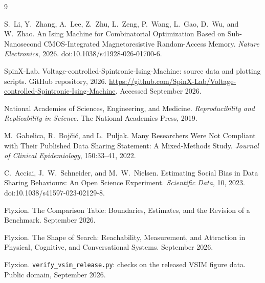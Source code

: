\documentclass[11pt]{article}
\theoremstyle{definition}
\theoremstyle{remark}
\begin{document}
\begin{thebibliography}{9}

S.~Li, Y.~Zhang, A.~Lee, Z.~Zhu, L.~Zeng, P.~Wang, L.~Gao, D.~Wu, and W.~Zhao.
An Ising Machine for Combinatorial Optimization Based on Sub-Nanosecond CMOS-Integrated Magnetoresistive Random-Access Memory.
\emph{Nature Electronics}, 2026. doi:10.1038/s41928-026-01700-6.

SpinX-Lab.
Voltage-controlled-Spintronic-Ising-Machine: source data and plotting scripts.
GitHub repository, 2026. \url{https://github.com/SpinX-Lab/Voltage-controlled-Spintronic-Ising-Machine}. Accessed September 2026.

National Academies of Sciences, Engineering, and Medicine.
\emph{Reproducibility and Replicability in Science}.
The National Academies Press, 2019.

M.~Gabelica, R.~Bojčić, and L.~Puljak.
Many Researchers Were Not Compliant with Their Published Data Sharing Statement: A Mixed-Methods Study.
\emph{Journal of Clinical Epidemiology}, 150:33--41, 2022.

C.~Acciai, J.~W.~Schneider, and M.~W.~Nielsen.
Estimating Social Bias in Data Sharing Behaviours: An Open Science Experiment.
\emph{Scientific Data}, 10, 2023. doi:10.1038/s41597-023-02129-8.

Flyxion.
The Comparison Table: Boundaries, Estimates, and the Revision of a Benchmark.
September 2026.

Flyxion.
The Shape of Search: Reachability, Measurement, and Attraction in Physical, Cognitive, and Conversational Systems.
September 2026.

Flyxion.
\texttt{verify\_vsim\_release.py}: checks on the released VSIM figure data.
Public domain, September 2026.

\end{thebibliography}
\end{document}
